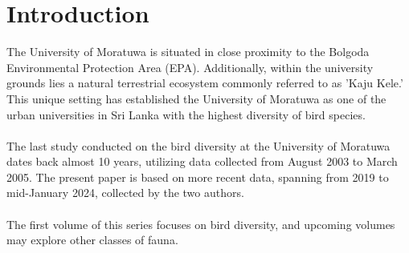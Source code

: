 \chapter{Introduction}
\label{cp:introduction}
The University of Moratuwa is situated in close proximity to the Bolgoda Environmental Protection Area (EPA). Additionally, within the university grounds lies a natural terrestrial ecosystem commonly referred to as 'Kaju Kele.' This unique setting has established the University of Moratuwa as one of the urban universities in Sri Lanka with the highest diversity of bird species.
\\\\
The last study conducted on the bird diversity at the University of Moratuwa dates back almost 10 years, utilizing data collected from August 2003 to March 2005. The present paper is based on more recent data, spanning from 2019 to mid-January 2024, collected by the two authors.
\\\\
The first volume of this series focuses on bird diversity, and upcoming volumes may explore other classes of fauna.

